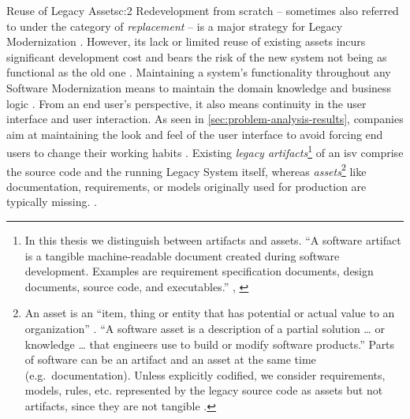 \begin{thesisstakeholderrequirement}{Reuse of Legacy Assets}{c:2}
Redevelopment from scratch -- sometimes also referred to under the category of \emph{replacement} \autocite{Almonaies2010SOAStrategies} -- is a major strategy for \gls{Legacy Modernization} \autocite{Wagner2014,Khadka2016PHD,Sneed2010SoftwareMigration,Almonaies2010SOAStrategies,Bisbal1999LegacyInformationSystems}.
However, its lack or limited reuse of existing  assets incurs significant development cost \autocite{Khadka2016PHD} and bears the risk of the new system not being as functional as the old one \autocite{Almonaies2010SOAStrategies}.
Maintaining a system's functionality throughout any \gls{Software Modernization} means to maintain the domain knowledge and business logic \autocite{Wagner2014}.
From an end user's perspective, it also means continuity in the user interface and user interaction.
As seen in \cref{sec:problem-analysis-results}, companies aim at maintaining the look and feel of the  user interface to avoid forcing end users to change their working habits \autocite{Rodriguez-Echeverria2012MIGRARIA,Lucia2008,Distante2002}.
Existing \emph{legacy artifacts}\footnote{In this thesis we distinguish between \glspl{artifact} and \glspl{asset}.
``A software artifact is a tangible machine-readable document created during software development.
Examples are requirement specification documents, design documents, source code, and executables.'' \autocite{OMG2016KDM}, \autocite[cf.~\emph{physical asset}][]{ISO/IEEE24765Vocabulary}} of an \gls{isv} comprise the  source code and the running \gls{Legacy System} itself, whereas \emph{assets}\footnote{An asset is an ``item, thing or entity that has potential or actual value to an organization'' \autocite{ISO/IEEE24765Vocabulary}.
``A software asset is a description of a partial solution \ldots{} or knowledge \ldots{} that engineers use to build or modify software products.'' \autocite{OMG2016KDM} Parts of software can be an artifact and an asset at the same time (e.g.~documentation).
Unless explicitly codified, we consider requirements, models, rules, etc.
represented by the legacy source code as assets but not artifacts, since they are not tangible \autocite[cf.~\emph{intangible assets}][]{ISO/IEEE24765Vocabulary}.} like documentation, requirements, or models originally used for production are typically missing.
\autocite{Wagner2014,Bisbal1999LegacyInformationSystems,Sneed2010SoftwareMigration,warren2012renaissance,Batlajery2014IndustrialSurveyModernization,Lucia2008}.

\end{thesisstakeholderrequirement}
